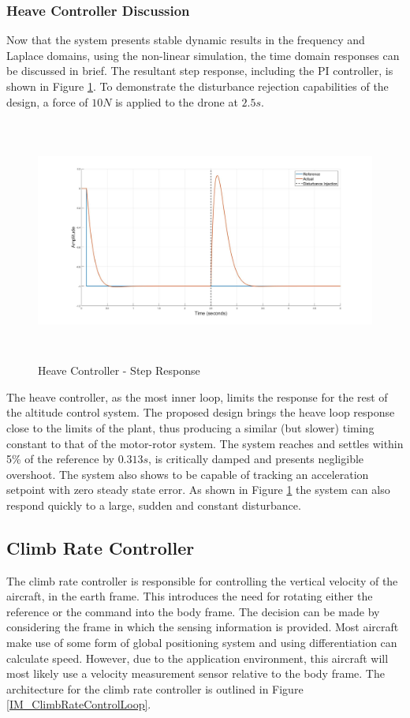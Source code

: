 	 
	 
	 \subsubsection{Heave Controller Discussion}
	 Now that the system presents stable dynamic results in the frequency and Laplace domains, using the non-linear simulation, the time domain responses can be discussed in brief. The resultant step response, including the PI controller, is shown in Figure \ref{IM_HeaveStepDist}. To demonstrate the disturbance rejection capabilities of the design, a force of $10N$ is applied to the drone at $2.5s$.
	 
	 \begin{figure}[H]
	 	\centering
	 	\includegraphics[height = 8cm]{../Design/Matlab/Controllers/heave_step.jpg}
	 	\caption{Heave Controller -  Step Response}
	 	\label{IM_HeaveStepDist}
	 \end{figure}
	 
	 The heave controller, as the most inner loop, limits the response for the rest of the altitude control system. The proposed design brings the heave loop response close to the limits of the plant, thus producing a similar (but slower) timing constant to that of the motor-rotor system. The system reaches and settles within 5\% of the reference by $0.313s$, is critically damped and presents negligible overshoot. The system also shows to be capable of tracking an acceleration setpoint with zero steady state error. As shown in Figure \ref{IM_HeaveStepDist} the system can also respond quickly to a large, sudden and constant disturbance.
	 
	 \subsection{Climb Rate Controller}
	 The climb rate controller is responsible for controlling the vertical velocity of the aircraft, in the earth frame. This introduces the need for rotating either the reference or the command into the body frame. The decision can be made by considering the frame in which the sensing information is provided. Most aircraft make use of some form of global positioning system and using differentiation can calculate speed. However, due to the application environment, this aircraft will most likely use a velocity measurement sensor relative to the body frame. The architecture for the climb rate controller is outlined in Figure \ref{IM_ClimbRateControlLoop}. 
	 
